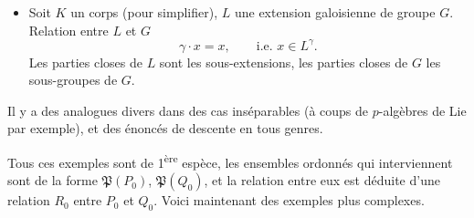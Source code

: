 \documentclass[11pt]{article}
\newcommand{\printedpage}[1]{\marginpar{\footnotesize p.~#1}}
\def\dcprintedpending{}
\newcommand{\msp}[1]{\marginpar{\footnotesize\raggedright
  \ifx\dcprintedpending\empty\else p.~\dcprintedpending\par\fi
  [#1]}\gdef\dcprintedpending{}}
\newcommand{\Pf}{\mathfrak{P}}
\begin{document}
\printedpage{49}

\begin{itemize}[leftmargin=2.5em]
\item[5)] Soit $K$ un corps (pour simplifier), $L$ une extension galoisienne de groupe $G$. Relation entre $L$ et $G$
\[
\gamma\cdot x=x,\qquad \text{i.e. } x\in L^{\gamma}.
\]
Les parties closes de $L$ sont les sous-extensions, les parties closes de $G$ les sous-groupes de $G$.
\end{itemize}

Il y a des analogues divers dans des cas inséparables (à coups de $p$-algèbres de Lie par exemple), et des énoncés de descente en tous genres.

\msp{page 80}Tous ces exemples sont de 1\textsuperscript{ère} espèce, les ensembles ordonnés qui interviennent sont de la forme $\Pf(P_0)$, $\Pf(Q_0)$, et la relation entre eux est déduite d'une relation $R_0$ entre $P_0$ et $Q_0$. Voici maintenant des exemples plus complexes.
\end{document}
